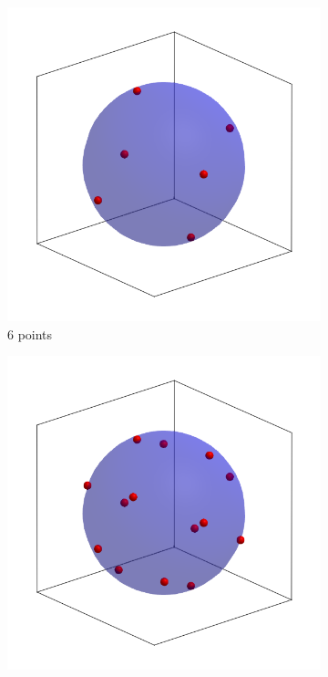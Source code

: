\documentclass[main.tex]{subfiles}
\begin{document}
\begin{figure}
	\centering
	\hfill\begin{subfigure}{0.2\linewidth}
		\centering
		\includegraphics[width=\linewidth]{figures/gcmc/lebedev_6}
		\caption{6 points}
	\end{subfigure}\hfill%
	\begin{subfigure}{0.2\linewidth}
		\centering
		\includegraphics[width=\linewidth]{figures/gcmc/lebedev_14}

\end{subfigure}
\end{figure}
\end{document}
